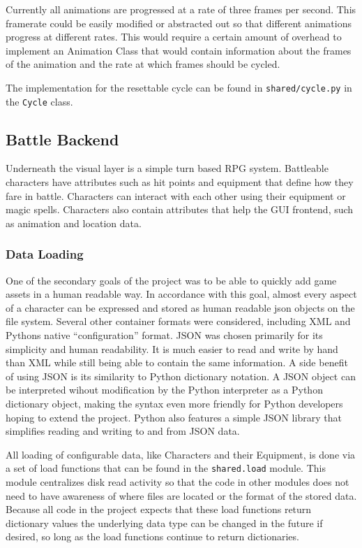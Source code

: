 \documentclass[11pt]{article}
\begin{document}
Currently all animations are progressed at a rate of three frames per second.  This framerate could be easily modified or abstracted out so that different animations progress at different rates.  This would require a certain amount of overhead to implement an Animation Class that would contain information about the frames of the animation and the rate at which frames should be cycled. 

The implementation for the resettable cycle can be found in \texttt{shared/cycle.py} in the \texttt{Cycle} class. 

\subsection{Battle Backend}

Underneath the visual layer is a simple turn based RPG system.  Battleable characters have attributes such as hit points and equipment that define how they fare in battle.  Characters can interact with each other using their equipment or magic spells.  Characters also contain attributes that help the GUI frontend, such as animation and location data.

\subsubsection{Data Loading}

One of the secondary goals of the project was to be able to quickly add game assets in a human readable way.  In accordance with this goal, almost every aspect of a character can be expressed and stored as human readable json objects on the file system.  Several other container formats were considered, including XML and Pythons native ``configuration'' format.  JSON \cite{JSON} was chosen primarily for its simplicity and human readability.  It is much easier to read and write by hand than XML while still being able to contain the same information.  A side benefit of using JSON is its similarity to Python dictionary notation.  A JSON object can be interpreted wihout modification by the Python interpreter as a Python dictionary object, making the syntax even more friendly for Python developers hoping to extend the project.  Python also features a simple JSON library that simplifies reading and writing to and from JSON data.

All loading of configurable data, like Characters and their Equipment, is done via a set of load functions that can be found in the \texttt{shared.load} module. This module centralizes disk read activity so that the code in other modules does not need to have awareness of where files are located or the format of the stored data.  Because all code in the project expects that these load functions return dictionary values the underlying data type can be changed in the future if desired, so long as the load functions continue to return dictionaries.
\end{document}
